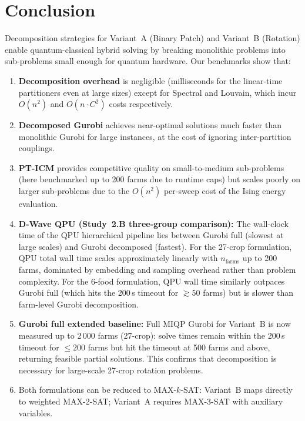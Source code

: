 \documentclass[11pt,a4paper]{article}
\begin{document}
\section{Conclusion}

Decomposition strategies for Variant~A (Binary Patch) and Variant~B (Rotation)
enable quantum-classical hybrid solving by breaking monolithic problems into
sub-problems small enough for quantum hardware.  Our benchmarks show that:

\begin{enumerate}
  \item \textbf{Decomposition overhead} is negligible (milliseconds for the
    linear-time partitioners even at large sizes) except for Spectral and Louvain,
    which incur $O(n^2)$ and
    $O(n \cdot C^2)$ costs respectively.
  \item \textbf{Decomposed Gurobi} achieves near-optimal solutions much faster than
    monolithic Gurobi for large instances, at the cost of ignoring inter-partition
    couplings.
  \item \textbf{PT-ICM} provides competitive quality on small-to-medium sub-problems
    (here benchmarked up to 200 farms due to runtime caps) but scales poorly on
    larger sub-problems due to the
    $O(n^2)$ per-sweep cost of the Ising energy evaluation.
  \item \textbf{D-Wave QPU (Study~2.B three-group comparison):}
    The wall-clock time of the QPU hierarchical pipeline lies between
    Gurobi full (slowest at large scales) and Gurobi decomposed (fastest).
    For the 27-crop formulation, QPU total wall time scales approximately
    linearly with $n_{\mathrm{farms}}$ up to 200 farms, dominated by
    embedding and sampling overhead rather than problem complexity.
    For the 6-food formulation, QPU wall time similarly outpaces Gurobi full
    (which hits the 200\,s timeout for $\gtrsim 50$ farms) but is slower
    than farm-level Gurobi decomposition.
  \item \textbf{Gurobi full extended baseline:} Full MIQP Gurobi for Variant~B
    is now measured up to 2\,000 farms (27-crop): solve times remain within
    the 200\,s timeout for $\le 200$ farms but hit the timeout at 500 farms and
    above, returning feasible partial solutions.  This confirms that decomposition
    is necessary for large-scale 27-crop rotation problems.
  \item Both formulations can be reduced to MAX-$k$-SAT:
    Variant~B maps directly to weighted MAX-2-SAT;
    Variant~A requires MAX-3-SAT with auxiliary variables.
\end{enumerate}
\end{document}
